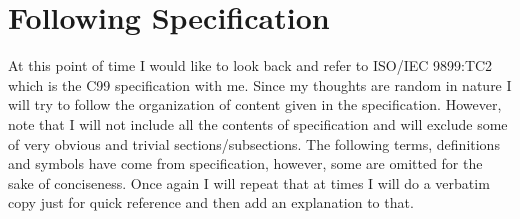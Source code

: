 \chapter{Following Specification}
\startcolumns[n=3,distance=2em]
  \placelist
    [section]
    [alternative=c, %
     interaction=all,]
\stopcolumns


At this point of time I would like to look back and refer to ISO/IEC
9899:TC2 which is the C99 specification with me. Since my thoughts are
random in nature I will try to follow the organization of content
given in the specification. However, note that I will not include all
the contents of specification and will exclude some of very obvious
and trivial sections/subsections. The following terms, definitions and
symbols have come from specification, however, some are omitted for
the sake of conciseness. Once again I will repeat that at times I will
do a verbatim copy just for quick reference and then add an
explanation to that.

